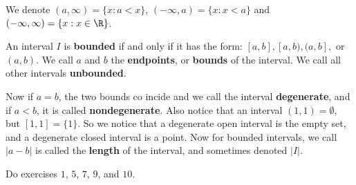 We denote $(a,\infty)=\{x: a<x\}$, $(-\infty,a)=\{x: x<a\}$ and $(-\infty,\infty)=\{x: x \in \R\}$.

\begin{definition}
  An interval $I$ is \textbf{bounded} if and only if it has the form: $[a,b],[a,b),(a,b],$ or $(a,b)$. We call $a$ and $b$ 
  the \textbf{endpoints}, or \textbf{bounds} of the interval. We call all other intervals \textbf{unbounded}.
\end{definition}

Now if $a=b$, the two bounds co incide and we call the interval \textbf{degenerate}, and if $a<b$, it is called \textbf{nondegenerate}. 
Also notice that an interval $(1,1)=\emptyset$, but $[1,1]=\{1\}$. So we notice that a degenerate open interval is the empty set, and a degenerate closed interval is a point. Now for bounded intervals, we call $|a-b|$ is called the \textbf{length} of the interval, and sometimes denoted $|I|$.

\begin{HW}
  Do exercises $1$, $5$, $7$, $9$, and $10$.
\end{HW}
